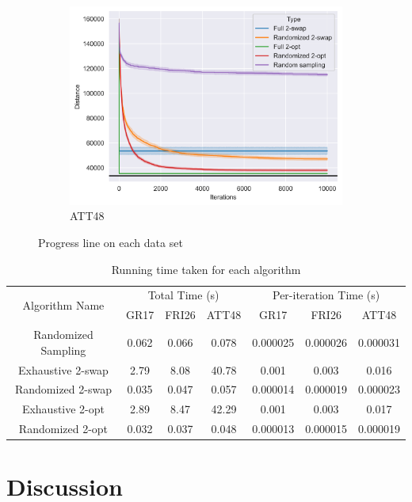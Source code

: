 \documentclass{article}
\begin{document}
\begin{figure}[h]
\begin{subfigure}[b]{0.33\textwidth}
        \includegraphics[width=\textwidth]{images/att48_plot.png}
        \caption{ATT48}
    \end{subfigure}
    \caption{Progress line on each data set}
    \label{fig:progress}
\end{figure}

\begin{table}[htbp]
    \centering
    \begin{tabular}{|ccccccc|}
        \hline
        \multirow{2}{*}{Algorithm Name} & \multicolumn{3}{c}{Total Time (s)} & \multicolumn{3}{c|}{Per-iteration Time (s)} \\
                                        & GR17 & FRI26 & ATT48 & GR17 & FRI26 & ATT48 \\
        \hline
        \hline
        Randomized Sampling & 0.062 & 0.066 & 0.078 & 0.000025 & 0.000026 & 0.000031 \\
        Exhaustive 2-swap & 2.79 & 8.08 & 40.78 & 0.001 & 0.003 & 0.016 \\
        Randomized 2-swap & 0.035 & 0.047 & 0.057 & 0.000014 & 0.000019 & 0.000023 \\
        Exhaustive 2-opt & 2.89 & 8.47 & 42.29 & 0.001 & 0.003 & 0.017 \\
        Randomized 2-opt & 0.032 & 0.037 & 0.048 & 0.000013 & 0.000015 & 0.000019 \\
        \hline
    \end{tabular}
    \caption{Running time taken for each algorithm}
    \label{table:time}
\end{table}

\section{Discussion}
\end{document}
